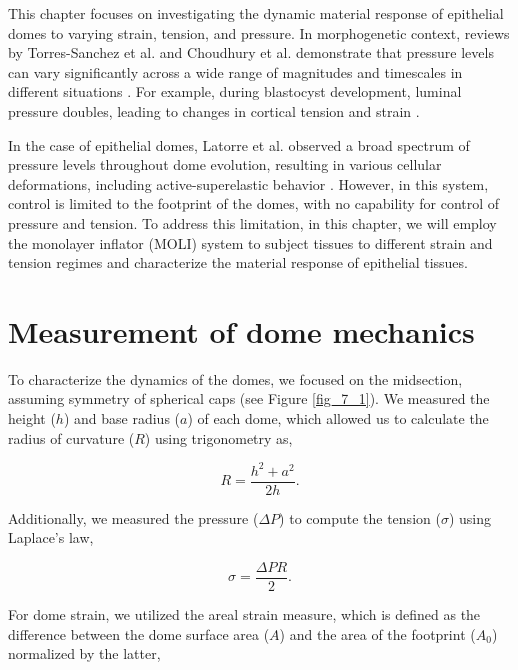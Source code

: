 This chapter focuses on investigating the dynamic material response of epithelial domes to varying strain, tension, and pressure. In morphogenetic context, reviews by Torres-Sanchez et al. and Choudhury et al. demonstrate that pressure levels can vary significantly across a wide range of magnitudes and timescales in different situations \cite{torres-sanchez2021, choudhury2022a}. For example, during blastocyst development, luminal pressure doubles, leading to changes in cortical tension and strain \cite{chan2019}.

In the case of epithelial domes, Latorre et al. observed a broad spectrum of pressure levels throughout dome evolution, resulting in various cellular deformations, including active-superelastic behavior  \cite{latorre2018}. However, in this system, control is limited to the footprint of the domes, with no capability for control of pressure and tension. To address this limitation, in this chapter, we will employ the monolayer inflator (MOLI) system to subject tissues to different strain and tension regimes and characterize the material response of epithelial tissues.

\hypertarget{measurement-of-dome-mechanics}{%
	\section{Measurement of dome mechanics}\label{measurement-of-dome-mechanics}}

To characterize the dynamics of the domes, we focused on the midsection, assuming symmetry of spherical caps (see Figure \ref{fig_7_1}). We measured the height ($h$) and base radius ($a$) of each dome, which allowed us to calculate the radius of curvature ($R$) using trigonometry as,

\begin{equation}
	\label{eqn:radiuscurve}
	R = \frac{h^2 + a^2}{2h}.
\end{equation}

\vspace{2em}

Additionally, we measured the pressure ($\Delta P$) to compute the tension ($\sigma$) using Laplace's law,

\begin{equation}
	\label{eqn:laplace}
	\sigma = \frac{\Delta PR }{2} .
\end{equation}

For dome strain, we utilized the areal strain measure, which is defined as the difference between the dome surface area ($A$) and the area of the footprint ($A_{0}$) normalized by the latter,

